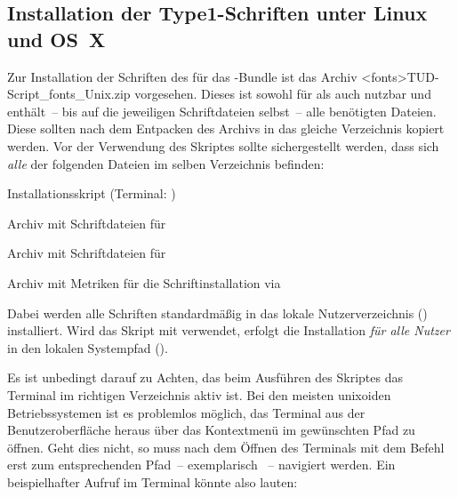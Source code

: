 \subsection{Installation der Type1-Schriften unter Linux und OS~X}
%
%
Zur Installation der Schriften des \CDs für das \TUDScript-Bundle ist das 
Archiv \GitHubDownload*<fonts>{TUD-Script_fonts_Unix.zip} vorgesehen. Dieses 
ist sowohl für  als auch 
 nutzbar und enthält~-- bis auf die jeweiligen 
Schriftdateien selbst~-- alle benötigten Dateien. Diese sollten nach dem 
Entpacken des Archivs in das gleiche Verzeichnis kopiert werden. Vor der 
Verwendung des Skriptes  sollte sichergestellt 
werden, dass sich \emph{alle} der folgenden Dateien im selben Verzeichnis 
befinden:
%
\settowidth{}%
\begin{description}[labelwidth=\tudscrdim,labelsep=1em]
  \item[\File*{tudscr_fonts_install.sh}]Installationsskript
    (Terminal: )
  \item[\File*{Univers_PS.zip}]Archiv mit Schriftdateien für \Univers
  \item[\File*{DIN_Bd_PS.zip}]Archiv mit Schriftdateien für \DIN
  \item[\File*{tudscr_fonts_install.zip}]Archiv mit Metriken für die
    Schriftinstallation via 
\end{description}
%
Dabei werden alle Schriften standardmäßig in das lokale Nutzerverzeichnis 
() installiert. Wird das Skript mit  verwendet, 
erfolgt die Installation \emph{für alle Nutzer} in den lokalen Systempfad 
().

Es ist unbedingt darauf zu Achten, das beim Ausführen des Skriptes das Terminal 
im richtigen Verzeichnis aktiv ist. Bei den meisten unixoiden Betriebssystemen 
ist es problemlos möglich, das Terminal aus der Benutzeroberfläche heraus über 
das Kontextmenü im gewünschten Pfad zu öffnen. Geht dies nicht, so muss nach 
dem Öffnen des Terminals mit dem Befehl  erst zum entsprechenden 
Pfad~-- exemplarisch ~-- 
navigiert werden. Ein beispielhafter Aufruf im Terminal könnte also lauten:
%
\begin{quoting}
\newline
{}
\end{quoting}



